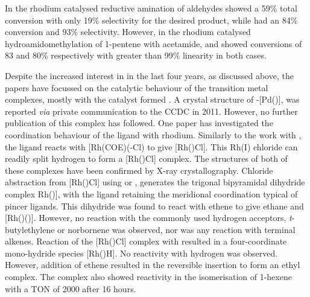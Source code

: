 In the rhodium catalysed reductive amination of aldehydes \tBuxantphos{} showed a 59\% total conversion with only 19\% selectivity for the desired product, while \Phxantphos{} had an 84\% conversion and 93\% selectivity.\cite{Raoufmoghaddam2013} However, in the rhodium catalysed hydroamidomethylation of 1-pentene with acetamide, \Phxantphos{} and \tBuxantphos{} showed conversions of 83 and 80\% respectively with greater than 99\% linearity in both cases.\cite{Raoufmoghaddam2013b}  

Despite the increased interest in \tBuxantphos{} in the last four years, as discussed above, the papers have focussed on the catalytic behaviour of the transition metal complexes, mostly with the catalyst formed .  A crystal structure of \trans-[Pd(\tBuxantphos)], was reported \emph{via} private communication to the \gls{CCDC} in 2011.  However, no further publication of this complex has followed.  One paper has investigated the coordination behaviour of the \tBuxantphos{} ligand with rhodium.\cite{Haibach2013}  Similarly to the work with \iPrxantphos{}, the \tBuxantphos{} ligand reacts with [Rh(COE)(\hapto{}-Cl)\ce{]2} to give [Rh(\tBuxantphosk)Cl].  This Rh(I) chloride can readily split hydrogen to form a [Rh(\tBuxantphosk)Cl] complex.  The structures of both of these complexes have been confirmed by X-ray crystallography.  Chloride abstraction from [Rh(\tBuxantphosk)Cl] using  or , generates the trigonal bipyramidal dihydride complex Rh(\tBuxantphosk)], with the \tBuxantphos{} ligand retaining the meridional coordination typical of pincer ligands.  This dihydride was found to react with ethene to give ethane and [Rh(\tBuxantphosk)()].  However, no reaction with the commonly used hydrogen acceptors, \emph{t}-butylethylene or norbornene was observed, nor was any reaction with terminal alkenes.  Reaction of the [Rh(\tBuxantphosk)Cl] complex with  resulted in a four-coordinate mono-hydride species [Rh(\tBuxantphos)H].  No reactivity with hydrogen was observed.  However, addition of ethene resulted in the reversible insertion to form an ethyl complex.  The complex also showed reactivity in the isomerisation of 1-hexene with a \gls{TON} of 2000 after 16 hours.  

